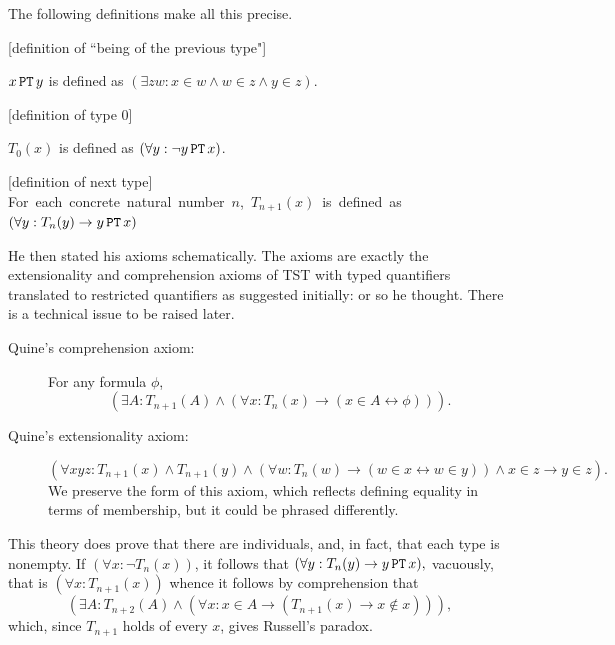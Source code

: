\documentclass[12pt]{article}
\begin{document}
The following definitions make all this precise.

\begin{dfn}\mbox{\negthinspace}

  [definition of ``being of the previous type"]

  $x\, {\tt PT}\, y$ is defined as $(\exists zw: x \in w \wedge w \in z \wedge y \in z).$

  [definition of type 0]

  $T_0(x)$ is defined as $(\forall y: \neg y\, {\tt PT}\, x)$.

  [definition of next type]
\mbox{\negthinspace}\\
\mbox{For each concrete natural number $n$, $T_{n+1}(x)$ is
defined as $(\forall y:  T_n(y) \rightarrow y\, {\tt PT}\, x)$}

\end{dfn}

He then stated his axioms schematically.  The axioms are exactly the extensionality and comprehension axioms of TST with typed quantifiers translated to restricted quantifiers as suggested initially: or so he thought.  There is a technical issue to be raised later.


\begin{description}

\item[Quine's comprehension axiom:]  For any formula $\phi$, $$(\exists A:  T_{n+1}(A) \wedge (\forall x:T_n(x) \rightarrow (x \in A \leftrightarrow \phi))).$$

\item[Quine's extensionality axiom:]  {\small $$(\forall xyz:T_{n+1}(x) \wedge  T_{n+1}(y) \wedge (\forall w:T_n(w) \rightarrow (w \in x \leftrightarrow w \in y)) \wedge x \in z \rightarrow y \in z).$$}  %
We preserve the form of this axiom, which reflects defining equality in terms of membership, but it could be phrased differently.

\end{description}
This theory does prove that there are individuals, and, in fact, that each type is nonempty.   If $(\forall x: \neg T_n(x))$,
it follows that $(\forall y:T_n(y) \rightarrow y\, {\tt PT}\, x),$ vacuously, that is $(\forall x:T_{n+1}(x))$ whence it follows by comprehension that $$(\exists A:T_{n+2}(A) \wedge (\forall x:x \in A \rightarrow (T_{n+1}(x) \rightarrow x \not\in x))),$$ which, since $T_{n+1}$ holds of every $x$, gives Russell's paradox.
\end{document}
